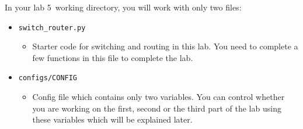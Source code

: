 \documentclass[11pt]{article}
\def\thelab{5}
\begin{document}
In your lab \thelab~working directory, you will work with only two files:
\begin{itemize}
    \item \texttt{switch\_router.py}
        \begin{itemize}
            \item Starter code for switching and routing in this lab. You need to complete a few functions in this file to complete the lab.
        \end{itemize}

    \item \texttt{configs/CONFIG}
        \begin{itemize}
            \item Config file which contains only two variables. You can control whether you are working on the first, second or the third part of the lab using these variables which will be explained later.
        \end{itemize}

\end{itemize}
\end{document}
